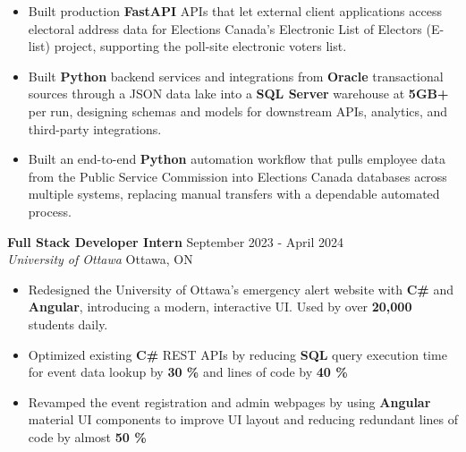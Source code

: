 \documentclass[a4paper]{article}
\begin{document}
\begin{itemize}
\item Built production \textbf{FastAPI} APIs that let external client applications access electoral address data for Elections Canada's Electronic List of Electors (E-list) project, supporting the poll-site electronic voters list.

\item Built \textbf{Python} backend services and integrations from \textbf{Oracle} transactional sources through a JSON data lake into a \textbf{SQL Server} warehouse at \textbf{5GB+} per run, designing schemas and models for downstream APIs, analytics, and third-party integrations.

\item Built an end-to-end \textbf{Python} automation workflow that pulls employee data from the Public Service Commission into Elections Canada databases across multiple systems, replacing manual transfers with a dependable automated process.

\end{itemize}

\textbf{Full Stack Developer Intern } \hfill September 2023 - April 2024\\
\textit{University of Ottawa} \hfill Ottawa, ON\\
\vspace{-2mm}
\begin{itemize} \itemsep -4pt
    \item Redesigned the University of Ottawa's emergency alert website with \textbf{C\#} and \textbf{Angular}, introducing a modern, interactive UI. Used by over \textbf{20,000} students daily.
     \item Optimized existing \textbf{C\#} REST APIs by reducing \textbf{SQL} query execution time for event data lookup by \textbf{30 \%} and lines of code by \textbf{40 \%}
    \item Revamped the event registration and admin webpages by using \textbf{Angular} material UI components to improve UI layout and reducing redundant lines of code by almost \textbf{50 \%}
\end{itemize}
\end{document}
